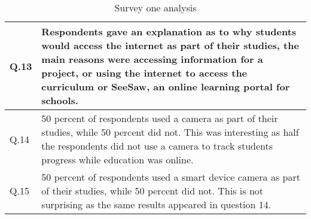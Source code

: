 \begin{table} [b]
\begin{tabular}{ | m{3em} | m{10cm}| }
Q.13 & Respondents gave an explanation as to why students would access the internet as part of their studies, the main reasons were accessing information for a project, or using the internet to access the curriculum or SeeSaw, an online learning portal for schools.  \\
\hline
Q.14 & 50 percent of respondents used a camera as part of their studies, while 50 percent did not. This was interesting as half the respondents did not use a camera to track students progress while education was online.  \\
\hline
Q.15 & 50 percent of respondents used a smart device camera as part of their studies, while 50 percent did not. This is not surprising as the same results appeared in question 14.  \\
\hline
\end{tabular}
\centering
\caption{Survey one analysis}
    \label{tab:my_label}
\end{table}
